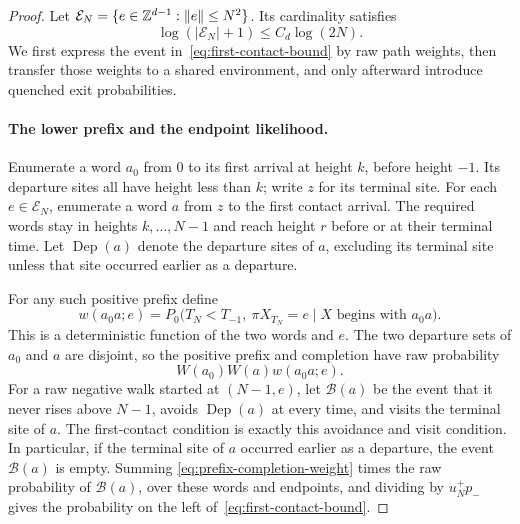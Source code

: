 \begin{proof}
Let $\mathcal E_N=\{e\in\mathbb Z^{d-1}:\|e\|\le N^2\}$.  Its cardinality
satisfies
\begin{equation}\label{eq:endpoint-cardinality}
 \log(|\mathcal E_N|+1)\le C_d\log(2N).
\end{equation}
We first express the event in~\eqref{eq:first-contact-bound} by raw path
weights, then transfer those weights to a shared environment, and only
afterward introduce quenched exit probabilities.

\paragraph{The lower prefix and the endpoint likelihood.}
Enumerate a word $a_0$ from $0$ to its first arrival at height $k$, before
height $-1$.  Its departure sites all have height less than $k$; write
$z$ for its terminal site.  For each $e\in\mathcal E_N$, enumerate a word
$a$ from $z$ to the first contact arrival.  The required words stay in
heights $k,\ldots,N-1$ and reach height $r$ before or at their terminal
time.  Let $\operatorname{Dep}(a)$ denote the departure sites of $a$,
excluding its terminal site unless that site occurred earlier as a
departure.

For any such positive prefix define
\[
 w(a_0a;e)=P_0\bigl(T_N<T_{-1},\ \pi X_{T_N}=e
                   \mid X\text{ begins with }a_0a\bigr).
\]
This is a deterministic function of the two words and $e$.  The two
departure sets of $a_0$ and $a$ are disjoint, so the positive prefix and
completion have raw probability
\begin{equation}\label{eq:prefix-completion-weight}
 W(a_0)W(a)w(a_0a;e).
\end{equation}
For a raw negative walk started at $(N-1,e)$, let $\mathcal B(a)$ be the
event that it never rises above $N-1$, avoids $\operatorname{Dep}(a)$
at every time, and visits the terminal site of $a$.  The first-contact
condition is exactly this avoidance and visit condition.  In particular,
if the terminal site of $a$ occurred earlier as a departure, the event
$\mathcal B(a)$ is empty.  Summing
\eqref{eq:prefix-completion-weight} times the raw probability of
$\mathcal B(a)$, over these words and endpoints, and dividing by
$u_N^+p_-$ gives the probability on the left
of~\eqref{eq:first-contact-bound}.


\end{proof}
